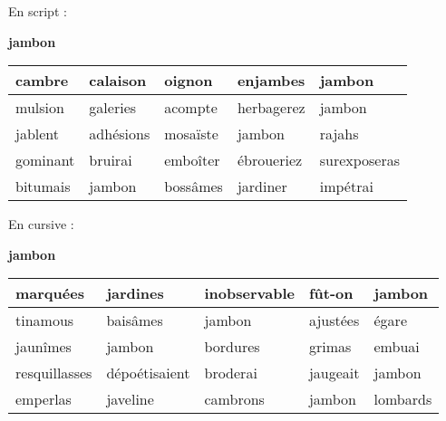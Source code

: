 \documentclass[a4paper, 11pt,oneside, fleqn]{article}
\begin{document}
\begin{onehalfspace}
\large\noindent En script :
\begin{center} {\huge \textbf{jambon}}
\vspace{0.25cm}\\
\begin{tabulary}{17cm}{|h|h|h|h|h|}
\hline
cambre & calaison & oignon & enjambes & jambon \\
\hline
mulsion & galeries & acompte & herbagerez & jambon \\
\hline
jablent & adhésions & mosaïste & jambon & rajahs \\
\hline
gominant & bruirai & emboîter & ébroueriez & surexposeras \\
\hline
bitumais & jambon & bossâmes & jardiner & impétrai \\
\hline
\end{tabulary}
\end{center}
\vspace{0.5cm}

\large\noindent En cursive :
\begin{center}
{\huge \textbf {{\cursive jambon}}}
\vspace{0.25cm}\\
\begin{tabulary}{17cm}{|i|i|i|i|i|}
\hline
marquées & jardines & inobservable & fût-on & jambon \\
\hline
tinamous & baisâmes & jambon & ajustées & égare \\
\hline
jaunîmes & jambon & bordures & grimas & embuai \\
\hline
resquillasses & dépoétisaient & broderai & jaugeait & jambon \\
\hline
emperlas & javeline & cambrons & jambon & lombards \\
\hline
\end{tabulary}
\end{center}

\end{onehalfspace}
\end{document}
